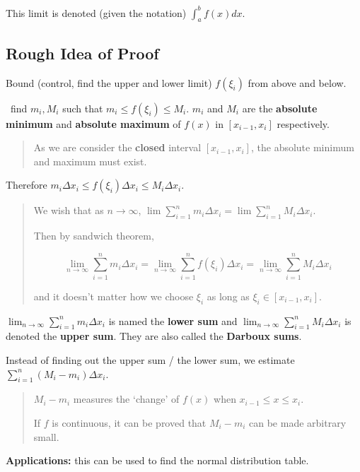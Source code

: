 This limit is denoted (given the notation) $\int_a^b f(x) dx$.

\subsection{Rough Idea of Proof}

Bound (control, find the upper and lower limit) $f(\xi_i)$ from above and below. 

\textrightarrow\ find $m_i, M_i$ such that $m_i \leq f(\xi_i) \leq M_i$. $m_i$ and $M_i$ are the \textbf{absolute minimum} and \textbf{absolute maximum} of $f(x)$ in $[x_{i-1}, x_i]$ respectively.

\begin{quote}
    As we are consider the \textbf{closed} interval $[x_{i-1}, x_i]$, the absolute minimum and maximum must exist.
\end{quote}

Therefore $m_i \Delta x_i \leq f(\xi_i) \Delta x_i \leq M_i \Delta x_i$.

\begin{quote}
    We wish that as $n \to \infty$, $\lim \sum_{i=1}^n m_i \Delta x_i = \lim \sum_{i=1}^n M_i \Delta x_i$.

    Then by sandwich theorem,
    
    $$ \lim_{n\to\infty} \sum_{i=1}^n m_i \Delta x_i = \lim_{n\to\infty} \sum_{i=1}^n f(\xi_i) \Delta x_i = \lim_{n\to\infty} \sum_{i=1}^n M_i \Delta x_i $$
    
    and it doesn't matter how we choose $\xi_i$ as long as $\xi_i \in [x_{i-1}, x_i]$.
\end{quote}

$\lim_{n\to\infty} \sum_{i=1}^n m_i \Delta x_i$ is named the \textbf{lower sum} and $\lim_{n\to\infty} \sum_{i=1}^n M_i \Delta x_i$ is denoted the \textbf{upper sum}. They are also called the \textbf{Darboux sums}.

Instead of finding out the upper sum / the lower sum, we estimate $\sum_{i=1}^n (M_i - m_i) \Delta x_i$.

\begin{quote}
    $M_i - m_i$ measures the `change' of $f(x)$ when $x_{i-1} \leq x \leq x_i$.
    
    If $f$ is continuous, it can be proved that $M_i - m_i$ can be made arbitrary small.
\end{quote}

\textbf{Applications:} this can be used to find the normal distribution table.

